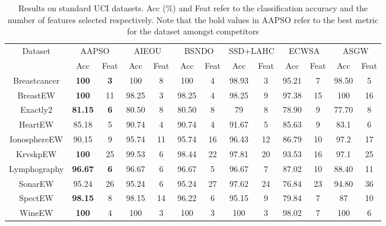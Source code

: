 \documentclass[final,3p,times]{elsarticle}
\begin{document}
\begin{table}[ht!]
    \centering
    \caption{{Results on standard UCI datasets. Acc (\%) and Feat refer to the classification accuracy and the number of features selected respectively. Note that the bold values in AAPSO refer to the best metric for the dataset amongst competitors}}
    \label{tab:uci}
   \begin{tabular}{c|cc|cc|cc|cc|cc|cc}
   \toprule
     \multirow{2}{*}{Dataset} & \multicolumn{2}{c|}{AAPSO} & \multicolumn{2}{c|}{AIEOU}& \multicolumn{2}{c|}{BSNDO}& \multicolumn{2}{c|}{SSD+LAHC}& \multicolumn{2}{c|}{ECWSA}& \multicolumn{2}{c}{ASGW}\\
    \cmidrule{2-13}
& Acc & Feat & Acc & Feat & Acc & Feat & Acc & Feat & Acc & Feat & Acc & Feat\\
    \midrule
Breastcancer&	\textbf{100}&	\textbf{3}&	100&	8&	100&	4&	98.93&	3&	95.21&	7&	98.50&	5	\\
BreastEW&	\textbf{100}&	11&	98.25&	3&	98.25&	4&	98.25&	9&	97.38&	15&	100&	16	\\
Exactly2&	\textbf{81.15}&	\textbf{6}&	80.50&	8&	80.50&	8&	79&	8&	78.90&	9&	77.70&	8	\\
HeartEW&	85.18&	5&	90.74&	4&	90.74&	4&	91.67&	5&	85.63&	9&	83.1&	6	\\
IonosphereEW&	90.15&	9&	95.74&	11&	95.74&	16&	96.43&	12&	86.79&	10&	97.2&	17	\\
KrvskpEW&	\textbf{100}&	25&	99.53&	6&	98.44&	22&	97.81&	20&	93.53&	16&	97.1&	25	\\
Lymphography&	\textbf{96.67}&	\textbf{6}&	96.67&	6&	96.67&	5&	96.67&	7&	87.02&	10&	88.40&	11	\\
SonarEW&	95.24&	26&	95.24&	6&	95.24&	27&	97.62&	24&	76.84&	23&	94.80&	36	\\
SpectEW&	\textbf{98.15}&	8&	98.15&	14&	96.22&	6&	95.15&	9&	79.84&	7&	87&	10	\\
WineEW&	\textbf{100}&	4&	100&	3&	100&	3&	100&	3&	98.02&	7&	100&	6	\\
\bottomrule
    \end{tabular}
\end{table}
\end{document}
